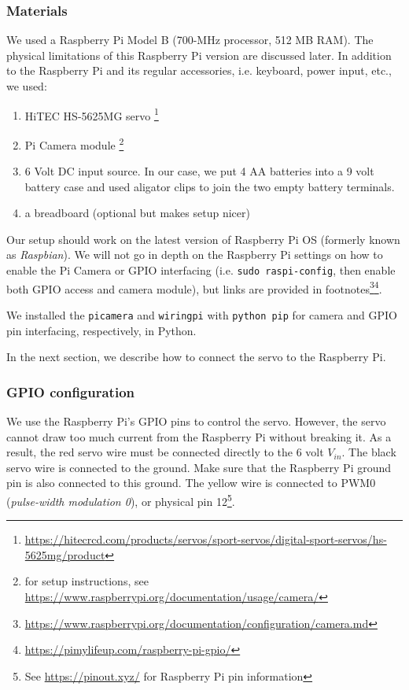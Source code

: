 \documentclass[conference, 12pt, onecolumn]{IEEEtran}
\begin{document}
\subsubsection{Materials}
We used a Raspberry Pi Model B (700-MHz processor, 512 MB RAM). The physical limitations of this Raspberry Pi version are discussed later. In addition to the Raspberry Pi and its regular accessories, i.e. keyboard, power input, etc., we used:
\begin{enumerate}
\item HiTEC HS-5625MG servo \footnote{\url{https://hitecrcd.com/products/servos/sport-servos/digital-sport-servos/hs-5625mg/product}}
\item Pi Camera module \footnote{for setup instructions, see \url{https://www.raspberrypi.org/documentation/usage/camera/}}
\item 6 Volt DC input source. In our case, we put 4 AA batteries into a 9 volt battery case and used aligator clips to join the two empty battery terminals.
\item a breadboard (optional but makes setup nicer)
\end{enumerate}
Our setup should work on the latest version of Raspberry Pi OS (formerly known as \textit{Raspbian}). We will not go in depth on the Raspberry Pi settings on how to enable the Pi Camera or GPIO interfacing (i.e. \texttt{sudo raspi-config}, then enable both GPIO access and camera module), but links are provided in footnotes\footnote{\url{https://www.raspberrypi.org/documentation/configuration/camera.md}}\footnote{\url{https://pimylifeup.com/raspberry-pi-gpio/}}. 

We installed the \texttt{picamera} and \texttt{wiringpi} with \texttt{python pip} for camera and GPIO pin interfacing, respectively, in Python.

In the next section, we describe how to connect the servo to the Raspberry Pi.
\subsubsection{GPIO configuration}
We use the Raspberry Pi's GPIO pins to control the servo. However, the servo cannot draw too much current from the Raspberry Pi without breaking it. As a result, the red servo wire must be connected directly to the 6 volt $V_{in}$. The black servo wire is connected to the ground. Make sure that the Raspberry Pi ground pin is also connected to this ground. The yellow wire is connected to PWM0 (\textit{pulse-width modulation 0}), or physical pin 12\footnote{See \url{https://pinout.xyz/} for Raspberry Pi pin information}.
\end{document}
